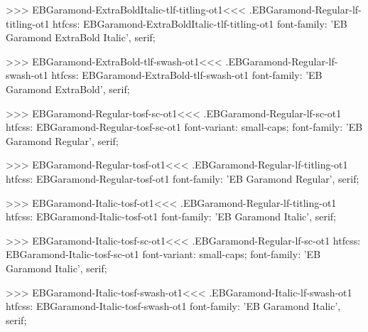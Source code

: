 {{{{{{{>>>
\<EBGaramond-ExtraBoldItalic-tlf-titling-ot1\><<<
.EBGaramond-Regular-lf-titling-ot1
htfcss:  EBGaramond-ExtraBoldItalic-tlf-titling-ot1  font-family: 'EB Garamond ExtraBold Italic', serif;

>>>
\<EBGaramond-ExtraBold-tlf-swash-ot1\><<<
.EBGaramond-Regular-lf-swash-ot1
htfcss:  EBGaramond-ExtraBold-tlf-swash-ot1  font-family: 'EB Garamond ExtraBold', serif;

>>>
\<EBGaramond-Regular-tosf-sc-ot1\><<<
.EBGaramond-Regular-lf-sc-ot1
htfcss:  EBGaramond-Regular-tosf-sc-ot1  font-variant: small-caps; font-family: 'EB Garamond Regular', serif;

>>>
\<EBGaramond-Regular-tosf-ot1\><<<
.EBGaramond-Regular-lf-titling-ot1
htfcss:  EBGaramond-Regular-tosf-ot1  font-family: 'EB Garamond Regular', serif;

>>>
\<EBGaramond-Italic-tosf-ot1\><<<
.EBGaramond-Regular-lf-titling-ot1
htfcss:  EBGaramond-Italic-tosf-ot1  font-family: 'EB Garamond Italic', serif;

>>>
\<EBGaramond-Italic-tosf-sc-ot1\><<<
.EBGaramond-Regular-lf-sc-ot1
htfcss:  EBGaramond-Italic-tosf-sc-ot1  font-variant: small-caps; font-family: 'EB Garamond Italic', serif;

>>>
\<EBGaramond-Italic-tosf-swash-ot1\><<<
.EBGaramond-Italic-lf-swash-ot1
htfcss:  EBGaramond-Italic-tosf-swash-ot1  font-family: 'EB Garamond Italic', serif;

}}}}}}}
